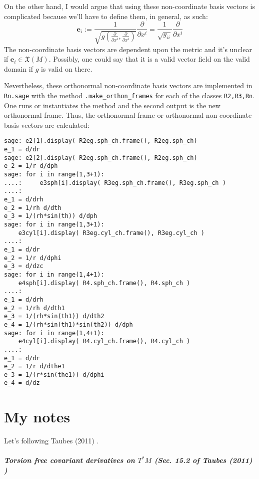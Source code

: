 \documentclass[10pt, twoside]{amsart}
\begin{document}
\begin{multicols*}{2}
On the other hand, I would argue that using these non-coordinate basis vectors is complicated because we'll have to define them, in general, as such:
\begin{equation}
  \mathbf{e}_i := \frac{1}{ \sqrt{ g(\frac{ \partial }{ \partial x^i}, \frac{ \partial }{ \partial x^i} ) } } \frac{ \partial }{ \partial x^i } = \frac{1}{\sqrt{g_{ii}}} \frac{ \partial }{ \partial x^i}
\end{equation}
The non-coordinate basis vectors are dependent upon the metric and it's unclear if $\mathbf{e}_i \in \mathfrak{X}(M)$. Possibly, one could say that it is a valid vector field on the valid domain if $g$ is valid on there.  

Nevertheless, these orthonormal non-coordinate basis vectors are implemented in \verb|Rn.sage| with the method \verb|.make_orthon_frames| for each of the classes \verb|R2,R3,Rn|.  One runs or instantiates the method and the second output is the new orthonormal frame.  Thus, the orthonormal frame or orthonormal non-coordinate basis vectors are calculated:
\begin{lstlisting}
sage: e2[1].display( R2eg.sph_ch.frame(), R2eg.sph_ch)
e_1 = d/dr
sage: e2[2].display( R2eg.sph_ch.frame(), R2eg.sph_ch)
e_2 = 1/r d/dph
sage: for i in range(1,3+1):
....:     e3sph[i].display( R3eg.sph_ch.frame(), R3eg.sph_ch )
....:     
e_1 = d/drh
e_2 = 1/rh d/dth
e_3 = 1/(rh*sin(th)) d/dph
sage: for i in range(1,3+1):
    e3cyl[i].display( R3eg.cyl_ch.frame(), R3eg.cyl_ch )
....:     
e_1 = d/dr
e_2 = 1/r d/dphi
e_3 = d/dzc
sage: for i in range(1,4+1):
    e4sph[i].display( R4.sph_ch.frame(), R4.sph_ch )
....:     
e_1 = d/drh
e_2 = 1/rh d/dth1
e_3 = 1/(rh*sin(th1)) d/dth2
e_4 = 1/(rh*sin(th1)*sin(th2)) d/dph
sage: for i in range(1,4+1):
    e4cyl[i].display( R4.cyl_ch.frame(), R4.cyl_ch )
....:     
e_1 = d/dr
e_2 = 1/r d/dthe1
e_3 = 1/(r*sin(the1)) d/dphi
e_4 = d/dz
\end{lstlisting}


\part{My notes}

Let's following Taubes (2011) \cite{CTaubes2011}.  

\subsubsection{Torsion free covariant derivatives on $T^*M$ (Sec. 15.2 of Taubes (2011) \cite{CTaubes2011})}


\end{multicols*}
\end{document}
